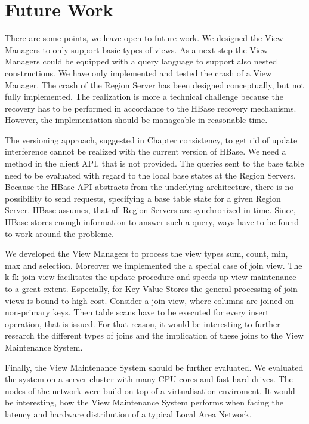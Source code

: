 \documentclass[11pt,a4paper,bibtotoc,idxtotoc,headsepline,footsepline,footexclude,BCOR12mm,DIV13]{scrbook}
\begin{document}
	
\chapter{Future Work}	
\label{chap:futurework}

There are some points, we leave open to future work. We designed the View Managers to only support basic types of views. As a next step the View Managers could be equipped with a query language to support also nested constructions.
We have only implemented and tested the crash of a View Manager. The crash of the Region Server has been designed conceptually, but not fully implemented. The realization is more a technical challenge because the recovery has to be performed in accordance to the HBase recovery mechanisms.  However, the implementation should be manageable in reasonable time.

The versioning approach, suggested in Chapter consistency, to get rid of update interference cannot be realized with the current version of HBase. We need a method in the client API, that is not provided. The queries sent to the base table need to be evaluated with regard to the local base states at the Region Servers. Because the HBase API abstracts from the underlying architecture, there is no possibility to send requests, specifying a base table state for a given Region Server. HBase assumes, that all Region Servers are synchronized in time. Since, HBase stores enough information to answer such a query, ways have to be found to work around the probleme.

We developed the View Managers to process the view types sum, count, min, max and selection. Moreover we implemented the a special case of join view. The k-fk join view facilitates the update procedure and speeds up view maintenance to a great extent. Especially, for Key-Value Stores the general processing of join views is bound to high cost. Consider a join view, where columns are joined on non-primary keys. Then table scans have to be executed for every insert operation, that is issued. For that reason, it would be interesting to further research the different types of joins and the implication of these joins to the View Maintenance System.

Finally, the View Maintenance System should be further evaluated. We evaluated the system on a server cluster with many CPU cores and fast hard drives. The nodes of the network were build on top of a virtualisation enviroment. It would be interesting, how the View Maintenance System performs when facing the latency and hardware distribution of a typical Local Area Network.
\end{document}

